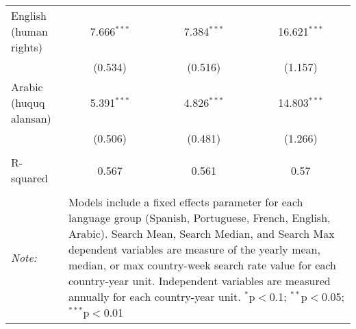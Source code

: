 \begin{table}[!htbp]
\begin{tabular}{@{\extracolsep{5pt}}lccc}
  English (human rights) & 7.666$^{***}$ & 7.384$^{***}$ & 16.621$^{***}$ \\ 
  & (0.534) & (0.516) & (1.157) \\ 
  Arabic (huquq alansan) & 5.391$^{***}$ & 4.826$^{***}$ & 14.803$^{***}$ \\ 
  & (0.506) & (0.481) & (1.266) \\ 
 \hline \\[-1.8ex] 
R-squared  & 0.567 & 0.561 & 0.57 \\ 
\hline 
\hline \\[-1.8ex] 
\textit{Note:}  & \multicolumn{3}{l}{\parbox[t]{8cm}{Models include a fixed effects parameter for each language group (Spanish, Portuguese, French, English, Arabic). Search Mean, Search Median, and Search Max dependent variables are measure of the yearly mean, median, or max country-week search rate value for each country-year unit. Independent variables are measured annually for each country-year unit. $^{*}$p$<$0.1; $^{**}$p$<$0.05; $^{***}$p$<$0.01}} \\ 
\end{tabular} 
\end{table} 
